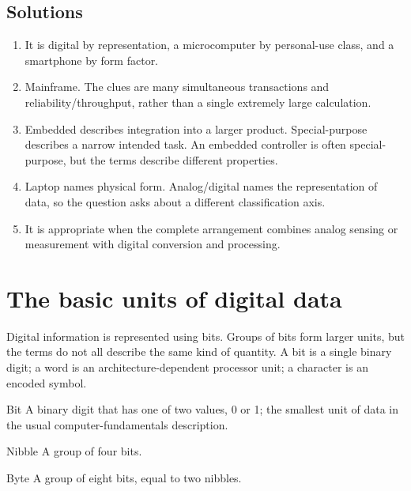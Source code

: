 \subsection*{Solutions}
\begingroup\small
\begin{enumerate}[label=\arabic*.]
  \item It is digital by representation, a microcomputer by personal-use
    class, and a smartphone by form factor.
  \item Mainframe. The clues are many simultaneous transactions and
    reliability/throughput, rather than a single extremely large calculation.
  \item Embedded describes integration into a larger product. Special-purpose
    describes a narrow intended task. An embedded controller is often
    special-purpose, but the terms describe different properties.
  \item Laptop names physical form. Analog/digital names the representation
    of data, so the question asks about a different classification axis.
  \item It is appropriate when the complete arrangement combines analog
    sensing or measurement with digital conversion and processing.
\end{enumerate}
\endgroup

\section{The basic units of digital data}
Digital information is represented using bits. Groups of bits form larger
units, but the terms do not all describe the same kind of quantity. A bit is
a single binary digit; a word is an architecture-dependent processor unit;
a character is an encoded symbol.

\begin{definitionbox}{Bit}
A binary digit that has one of two values, 0 or 1; the smallest unit of data
in the usual computer-fundamentals description.
\end{definitionbox}

\begin{definitionbox}{Nibble}
A group of four bits.
\end{definitionbox}

\begin{definitionbox}{Byte}
A group of eight bits, equal to two nibbles.
\end{definitionbox}

